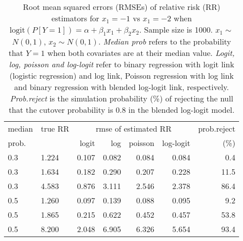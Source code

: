 \documentclass[12pt,a4paper]{article}
\begin{document}
\begin{table}[H] 
\small\sf\centering 
\caption{Root mean squared errors (RMSEs) of relative risk (RR) estimators for $x_1=-1$ vs $x_1=-2$ when $\mbox{logit}(P[Y=1])=\alpha+\beta_1 x_1 + \beta_2 x_2$. Sample size is 1000. $x_1 \sim $$N(0,1)$, $x_2 \sim N(0,1)$. {\it Median prob} refers to the probability that $Y=1$ when both covariates are at their median value. {\it Logit, log, poisson and log-logit} refer to binary regression with logit link (logistic regression) and log link, Poisson regression with log link and binary regression with blended log-logit link, respectively. {\it Prob.reject} is the simulation probability (\%) of rejecting the null that the cutover probability is $0.8$ in the blended log-logit model.} 
\begin{tabular}{llrrrrr} 
\toprule 
median & true RR & \multicolumn{4}{c}{rmse of estimated RR} & prob.reject \\ 
prob. & & logit & log & poisson & log-logit  & (\%) \\ \midrule 
0.3 & 1.224 & 0.107 & 0.082 & 0.084 & 0.084 &  0.4 \\  
0.3 & 1.634 & 0.182 & 0.290 & 0.207 & 0.228 & 11.5 \\  
0.3 & 4.583 & 0.876 & 3.111 & 2.546 & 2.378 & 86.4 \\  
0.5 & 1.260 & 0.097 & 0.139 & 0.088 & 0.095 &  9.2 \\  
0.5 & 1.865 & 0.215 & 0.622 & 0.452 & 0.457 & 53.8 \\  
0.5 & 8.200 & 2.048 & 6.905 & 6.326 & 5.654 & 93.4 \\  
\bottomrule 
\end{tabular} 
\end{table} 
\end{document}
